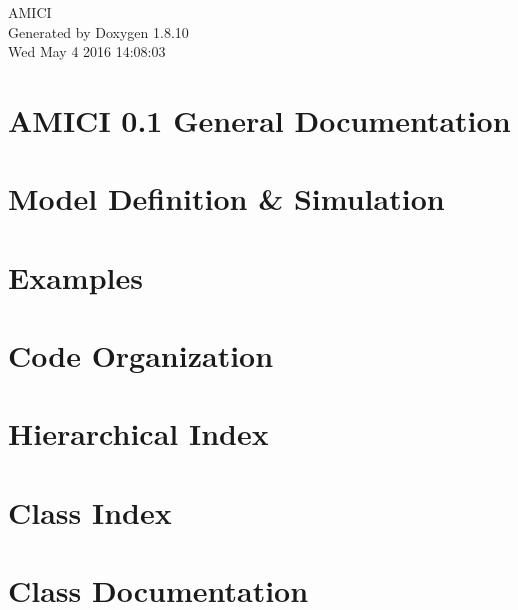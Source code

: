 \documentclass[twoside]{article}
\newcommand{\+}{\discretionary{\mbox{\scriptsize$\hookleftarrow$}}{}{}}
\begin{document}
\hypersetup{pageanchor=false,
             bookmarks=true,
             bookmarksnumbered=true,
             pdfencoding=unicode
            }
\begin{titlepage}
\vspace*{7cm}
\begin{center}%
{\Large A\+M\+I\+C\+I }\\
\vspace*{1cm}
{\large Generated by Doxygen 1.8.10}\\
\vspace*{0.5cm}
{\small Wed May 4 2016 14:08:03}\\
\end{center}
\end{titlepage}
\tableofcontents
{}
\hypersetup{pageanchor=true}

\section{A\+M\+I\+C\+I 0.1 General Documentation}
\label{index}\hypertarget{index}{}
\section{Model Definition \& Simulation}
\label{def_simu}
\hypertarget{def_simu}{}

\section{Examples}
\label{examples}
\hypertarget{examples}{}

\section{Code Organization}
\label{code}
\hypertarget{code}{}

\section{Hierarchical Index}

\section{Class Index}

\section{Class Documentation}












\end{document}

